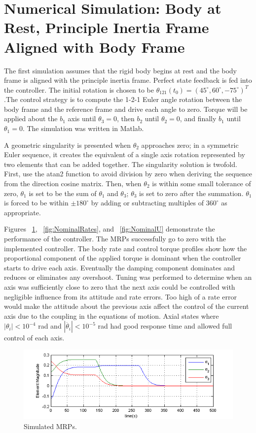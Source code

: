 \documentclass[paper]{aiaaNew}
\begin{document}
\section{Numerical Simulation: Body at Rest, Principle Inertia Frame Aligned with Body Frame}
The first simulation assumes that the rigid body begins at rest and the body frame is aligned with the principle inertia frame.  Perfect state feedback is fed into the controller.  The initial rotation is chosen to be $\theta_{121}(t_0)=(45^{\circ},60^{\circ},-75^{\circ})^T$.The control strategy is to compute the 1-2-1 Euler angle rotation between the body frame and the reference frame and drive each angle to zero.  Torque will be applied about the $b_1$ axis until $\theta_3=0$, then $b_2$ until $\theta_2=0$, and finally $b_1$ until $\theta_1=0$.  The simulation was written in Matlab.
\par
A geometric singularity is presented when $\theta_2$ approaches zero; in a symmetric Euler sequence, it creates the equivalent of a single axis rotation represented by two elements that can be added together.  The singularity solution is twofold. First, use the atan2 function to avoid division by zero when deriving the sequence from the direction cosine matrix.  Then, when $\theta_2$ is within some small tolerance of zero, $\theta_1$ is set to be the sum of $\theta_1$ and $\theta_3$; $\theta_3$ is set to zero after the summation.  $\theta_1$ is forced to be within $\pm 180^{\circ}$ by adding or subtracting multiples of $360^{\circ}$ as appropriate.
\par
Figures ~\ref{fig:NominalMRP},  ~\ref{fig:NominalRates}, and  ~\ref{fig:NominalU} demonstrate the performance of the controller. The MRPs successfully go to zero with the implemented controller. The body rate and control torque profiles show how the proportional component of the applied torque is dominant when the controller starts to drive each axis.  Eventually the damping component dominates and reduces or eliminates any overshoot.  Tuning was performed to determine when an axis was sufficiently close to zero that the next axis could be controlled with negligible influence from its attitude and rate errors. Too high of a rate error would make the attitude about the previous axis affect the control of the current axis due to the coupling in the equations of motion. Axial states where $\left | \theta_i \right |<10^{-4} $ rad and $\left | \dot{\theta_i} \right |<10^{-5}$ rad had good response time and allowed full control of each axis.
 \begin{figure}[htb]
 	\centering
 	\includegraphics[]{Figures/NominalMRP}
 	\caption{Simulated MRPs.}
 	\label{fig:NominalMRP}
 \end{figure}
\end{document}

